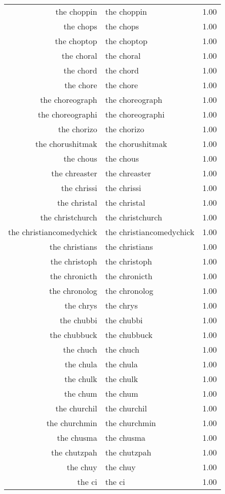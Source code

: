 \begin{table}[ht]
\begin{tabular}{rlr}
  the choppin & the choppin & 1.00 \\ 
  the chops & the chops & 1.00 \\ 
  the choptop & the choptop & 1.00 \\ 
  the choral & the choral & 1.00 \\ 
  the chord & the chord & 1.00 \\ 
  the chore & the chore & 1.00 \\ 
  the choreograph & the choreograph & 1.00 \\ 
  the choreographi & the choreographi & 1.00 \\ 
  the chorizo & the chorizo & 1.00 \\ 
  the chorushitmak & the chorushitmak & 1.00 \\ 
  the chous & the chous & 1.00 \\ 
  the chreaster & the chreaster & 1.00 \\ 
  the chrissi & the chrissi & 1.00 \\ 
  the christal & the christal & 1.00 \\ 
  the christchurch & the christchurch & 1.00 \\ 
  the christiancomedychick & the christiancomedychick & 1.00 \\ 
  the christians & the christians & 1.00 \\ 
  the christoph & the christoph & 1.00 \\ 
  the chronicth & the chronicth & 1.00 \\ 
  the chronolog & the chronolog & 1.00 \\ 
  the chrys & the chrys & 1.00 \\ 
  the chubbi & the chubbi & 1.00 \\ 
  the chubbuck & the chubbuck & 1.00 \\ 
  the chuch & the chuch & 1.00 \\ 
  the chula & the chula & 1.00 \\ 
  the chulk & the chulk & 1.00 \\ 
  the chum & the chum & 1.00 \\ 
  the churchil & the churchil & 1.00 \\ 
  the churchmin & the churchmin & 1.00 \\ 
  the chusma & the chusma & 1.00 \\ 
  the chutzpah & the chutzpah & 1.00 \\ 
  the chuy & the chuy & 1.00 \\ 
  the ci & the ci & 1.00 \\ 

\end{tabular}
\end{table}

